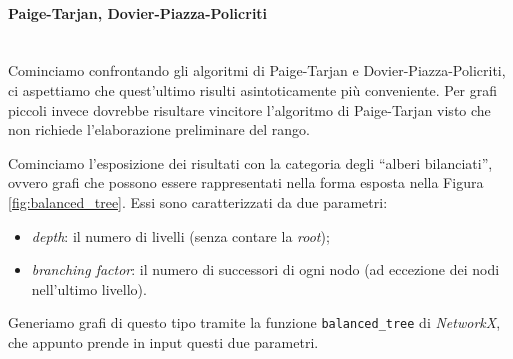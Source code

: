 \paragraph{Paige-Tarjan, Dovier-Piazza-Policriti}\mbox{}\\
Cominciamo confrontando gli algoritmi di Paige-Tarjan e Dovier-Piazza-Policriti, ci aspettiamo che quest'ultimo risulti asintoticamente più conveniente. Per grafi piccoli invece dovrebbe risultare vincitore l'algoritmo di Paige-Tarjan visto che non richiede l'elaborazione preliminare del rango.

Cominciamo l'esposizione dei risultati con la categoria degli ``alberi bilanciati'', ovvero grafi che possono essere rappresentati nella forma esposta nella Figura \ref{fig:balanced_tree}. Essi sono caratterizzati da due parametri:
\begin{itemize}
    \item \emph{depth}: il numero di livelli (senza contare la \emph{root});
    \item \emph{branching factor}: il numero di successori di ogni nodo (ad eccezione dei nodi nell'ultimo livello).
\end{itemize}

Generiamo grafi di questo tipo tramite la funzione \verb|balanced_tree| di \emph{NetworkX}, che appunto prende in input questi due parametri.

